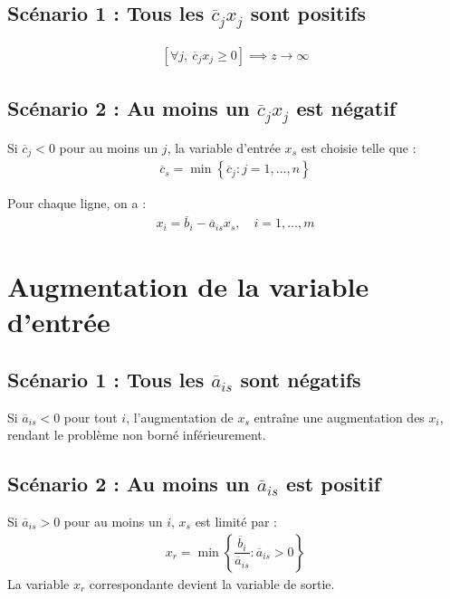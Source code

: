 \documentclass{report}
\begin{document}
\begin{multicols*}{2}
\subsection{Scénario 1 : Tous les $\overline{c}_j x_j$ sont positifs}
\begin{align*}
    \left[ \forall j,\ \overline{c}_j x_j \geq 0 \right] \implies
    z \longrightarrow \infty
\end{align*}

\subsection{Scénario 2 : Au moins un $\overline{c}_j x_j$ est négatif}

Si $\overline{c}_j < 0$ pour au moins un $j$, la variable d'entrée $x_s$ est choisie telle que :
\begin{align*}
    \overline{c}_s = \min\left\{ \overline{c}_j : j = 1, \dots, n \right\}
\end{align*}

Pour chaque ligne, on a :
\begin{align*}
    x_i = \overline{b}_i - \overline{a}_{is} x_s,\quad i = 1, \dots, m
\end{align*}

\section{Augmentation de la variable d'entrée}

\subsection{Scénario 1 : Tous les $\overline{a}_{is}$ sont négatifs}

Si $\overline{a}_{is} < 0$ pour tout $i$, l'augmentation de $x_s$ entraîne une augmentation
des $x_i$, rendant le problème non borné inférieurement.

\subsection{Scénario 2 : Au moins un $\overline{a}_{is}$ est positif}

Si $\overline{a}_{is} > 0$ pour au moins un $i$, $x_s$ est limité par :
\begin{align*}
    x_r = \min\left\{ \dfrac{\overline{b}_i}{\overline{a}_{is}} :
    \overline{a}_{is} > 0 \right\}
\end{align*}
La variable $x_r$ correspondante devient la variable de sortie.


\end{multicols*}
\end{document}

